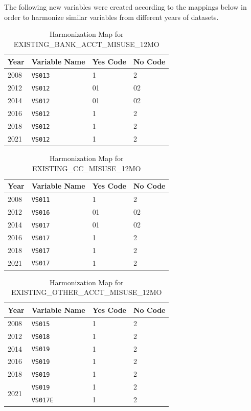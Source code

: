 \label{app: dataset_harmonization}

The following new variables were created according to the mappings below in order to harmonize similar variables from different years of datasets.

\begin{table}[ht]
\centering
\caption{Harmonization Map for EXISTING\_BANK\_ACCT\_MISUSE\_12MO}
\label{tab:bank_misuse_codes}
\begin{tabular}{llll}
\toprule
\textbf{Year} & \textbf{Variable Name} & \textbf{Yes Code} & \textbf{No Code} \\
\midrule
2008 & \texttt{VS013} & 1  & 2  \\
2012 & \texttt{VS012} & 01 & 02 \\
2014 & \texttt{VS012} & 01 & 02 \\
2016 & \texttt{VS012} & 1  & 2  \\
2018 & \texttt{VS012} & 1  & 2  \\
2021 & \texttt{VS012} & 1  & 2  \\
\bottomrule
\end{tabular}
\end{table}


\begin{table}[ht]
\centering
\caption{Harmonization Map for EXISTING\_CC\_MISUSE\_12MO}
\label{tab:cc_misuse_codes}
\begin{tabular}{llll}
\toprule
\textbf{Year} & \textbf{Variable Name} & \textbf{Yes Code} & \textbf{No Code} \\
\midrule
2008 & \texttt{VS011} & 1  & 2  \\
2012 & \texttt{VS016} & 01 & 02 \\
2014 & \texttt{VS017} & 01 & 02 \\
2016 & \texttt{VS017} & 1  & 2  \\
2018 & \texttt{VS017} & 1  & 2  \\
2021 & \texttt{VS017} & 1  & 2  \\
\bottomrule
\end{tabular}
\end{table}

\begin{table}[ht]
\centering
\caption{Harmonization Map for EXISTING\_OTHER\_ACCT\_MISUSE\_12MO}
\label{tab:other_misuse_codes}
\begin{tabular}{llll}
\toprule
\textbf{Year} & \textbf{Variable Name} & \textbf{Yes Code} & \textbf{No Code} \\
\midrule
2008 & \texttt{VS015}  & 1 & 2 \\
2012 & \texttt{VS018}  & 1 & 2 \\
2014 & \texttt{VS019}  & 1 & 2 \\
2016 & \texttt{VS019}  & 1 & 2 \\
2018 & \texttt{VS019}  & 1 & 2 \\
\midrule %
\multirow{2}{*}{2021} & \texttt{VS019}  & 1 & 2 \\
     & \texttt{VS017E} & 1 & 2 \\
\bottomrule
\end{tabular}
\end{table}

